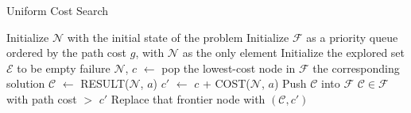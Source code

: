 \documentclass[a4paper,UKenglish,cleveref, autoref, thm-restate]{qlinhta}
\begin{document}
    \begin{algorithm}[H]
        \caption{Uniform Cost Search}\label{alg:uniform_cost_search}
        \begin{algorithmic}[1]
                \State Initialize $\mathcal{N}$ with the initial state of the problem
                \State Initialize $\mathcal{F}$ as a priority queue ordered by the path cost $g$, with $\mathcal{N}$ as the only element
                \State Initialize the explored set $\mathcal{E}$ to be empty
                        \State \Return failure
                    \EndIf
                    \State $\mathcal{N}$, $c$ $\gets$ pop the lowest-cost node in $\mathcal{F}$
                        \State \Return the corresponding solution
                    \EndIf
                        \State $\mathcal{C}$ $\gets$ RESULT($\mathcal{N}$, $a$)
                        \State $c'$ $\gets$ $c$ + COST($\mathcal{N}$, $a$)
                            \State Push $\mathcal{C}$ into $\mathcal{F}$
                        \ElsIf
                                {$\mathcal{C} \in \mathcal{F}$ with path cost $>$ $c'$}
                            \State Replace that frontier node with $(\mathcal{C}, c')$
                        \EndIf
                    \EndFor
                \EndWhile
            \EndFunction
        \end{algorithmic}
    \end{algorithm}
\end{document}

